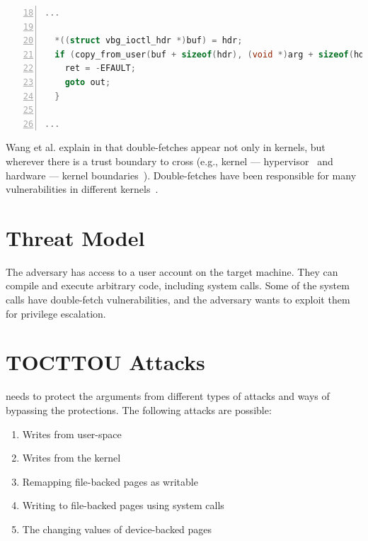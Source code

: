 \begin{lstlisting}[language=C, caption=CVE-2018-12633 Double Fetch Fix,
  label=code:cvedoublefetchfix,  breaklines=true
  postbreak=\mbox{\textcolor{red}{$\hookrightarrow$}\space},
  numbers=left,basicstyle=\scriptsize, firstnumber=18]
...

  *((struct vbg_ioctl_hdr *)buf) = hdr;
  if (copy_from_user(buf + sizeof(hdr), (void *)arg + sizeof(hdr), hdr.size_in - sizeof(hdr))) {
    ret = -EFAULT;
    goto out;
  }

...

\end{lstlisting}

Wang et al. explain in \cite{wang2018survey} that double-fetches appear not only
in kernels, but wherever there is a trust boundary to cross (e.g., kernel ---
hypervisor~\cite{wilhelm2016xenpwn} and hardware --- kernel
boundaries~\cite{lu2018untrusted}). Double-fetches have been responsible for many
vulnerabilities in different kernels~\cite{jurczyk2013bochspwn, wang2018survey}.


\section{Threat Model}
\label{sec:threatmodel}
The adversary has access to a user account on the target machine. They can compile
and execute arbitrary code, including system calls. Some of the system calls
have double-fetch vulnerabilities, and the adversary wants to exploit them for
privilege escalation.

\section{TOCTTOU Attacks}

\sysname needs to protect the arguments from different types of attacks and ways of
bypassing the protections. The following attacks are possible:

\begin{enumerate}
  \item \label{first} Writes from user-space
  \item \label{second} Writes from the kernel
  \item \label{third} Remapping file-backed pages as writable
  \item \label{fourth} Writing to file-backed pages using system calls
  \item \label{fifth} The changing values of device-backed pages
\end{enumerate}

